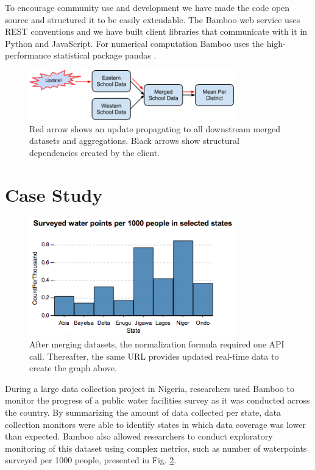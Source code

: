 \documentclass{sig-alternate}
\begin{document}
To encourage community use and development we have made the code open source and structured it to be easily extendable. The Bamboo web service uses REST conventions and we have built client libraries that communicate with it in Python and JavaScript.  For numerical computation Bamboo uses the high-performance statistical package pandas \cite{mckinney}.

\begin{figure}
\centering
\includegraphics[width=3.5in]{figures/update_flow}
\caption{Red arrow shows an update propagating to all downstream merged datasets and aggregations.  Black arrows show structural dependencies created by the client.}
\label{fig:updates}
\end{figure}

\section{Case Study}

\begin{figure}
\centering
\includegraphics[width=3.5in]{figures/summary.png}
\caption{After merging datasets, the normalization formula required one API
    call. Thereafter, the same URL provides updated real-time data to create the graph above.}
\label{fig:summary}
\end{figure}

During a large data collection project in Nigeria, researchers used Bamboo to monitor the progress of a public water facilities survey as it was conducted across the country. By summarizing the amount of data collected per state, data collection monitors were able to identify states in which data coverage was lower than expected.
Bamboo also allowed researchers to conduct exploratory monitoring of this
dataset using complex metrics, such as number of waterpoints surveyed per 1000
people, presented in Fig. \ref{fig:summary}.
\end{document}
